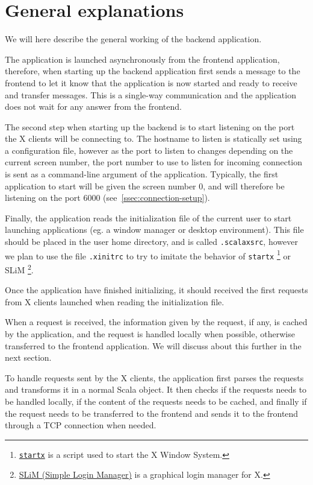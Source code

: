 \section{General explanations}
%
We will here describe the general working of the backend application.

The application is launched asynchronously from the frontend application, 
therefore, when starting up the backend application first sends a message to 
the frontend to let it know that the application is now started and ready to 
receive and transfer messages. This is a single-way communication and the 
application does not wait for any answer from the frontend.

The second step when starting up the backend is to start listening on the 
port the X clients will be connecting to. The hostname 
to listen is statically set using a configuration file, however as the port 
to listen to changes depending on the current screen number, the port number to 
use to listen for incoming connection is sent as a command-line argument of the 
application. Typically, the first application to start will be given the 
screen number $0$, and will therefore be listening on the port $6000$ 
(see~\ref{ssec:connection-setup}).

Finally, the application reads the initialization file of the current user 
to start launching applications (eg. a window manager or desktop environment). 
This file should be placed in the user home directory, and is called 
\lstinline{.scalaxsrc}, however we plan to use the file \lstinline{.xinitrc} to 
try to imitate the behavior of \lstinline{startx}
\footnote{\href{http://linux.die.net/man/1/startx}{\lstinline{startx}} is a script used to start the X Window System.}
or SLiM
\footnote{\href{http://slim.berlios.de/}{SLiM (Simple Login Manager)} is a graphical login manager for X.}.

Once the application have finished initializing, it should received the first requests 
from X clients launched when reading the initialization file.

When a request is received, the information given by the request, if any, is cached 
by the application, and the request is handled locally when possible, otherwise 
transferred to the frontend application. We will discuss about this further in the next 
section.

To handle requests sent by the X clients, the application first parses the requests and 
transforms it in a normal Scala object. It then checks if the requests needs to be handled 
locally, if the content of the requests needs to be cached, and finally if the request 
needs to be transferred to the frontend and sends it to the frontend through a TCP connection 
when needed.